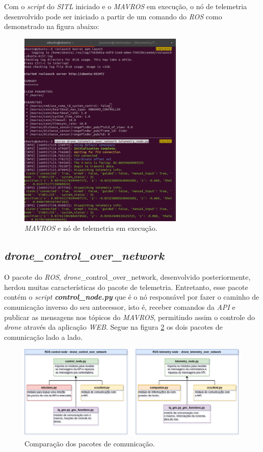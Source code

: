 \documentclass[12pt,a4paper,oneside]{book}
\begin{document}
Com o \textit{script} do \textit{SITL} iniciado e o \textit{MAVROS} em execução, o nó de telemetria desenvolvido pode ser iniciado a partir de um comando do \textit{ROS} como demonstrado na figura abaixo:
%
\begin{figure}[H]
  \centering
  \includegraphics[width=0.7\textwidth]{Images/Desenvolvimento/telemetry_node.png}
  \caption{\textit{MAVROS} e nó de telemetria em execução.}
  \label{fig:telemetry_node.png.0}
\end{figure}
%


\subsection{\textit{drone\_control\_over\_network}}

O pacote do \textit{ROS}, \textit{drone}\_control\_over\_network, desenvolvido posteriormente, herdou muitas características do pacote de telemetria. Entretanto, esse pacote contém o \textit{script} \textbf{\textit{control\_node.py}} que é o nó responsável por fazer o caminho de comunicação inverso do seu antecessor, isto é, receber comandos da \textit{API} e publicar as mensagens nos tópicos do \textit{MAVROS}, permitindo assim o controle do \textit{drone} através da aplicação \textit{WEB}. Segue na figura \ref{fig:comm_nodes.png.0} os dois pacotes de comunicação lado a lado.

%
\begin{figure}[H]
  \centering
  \includegraphics[width=1\textwidth]{Images/Desenvolvimento/comm_nodes.png}
  \caption{Comparação dos pacotes de comunicação.}
  \label{fig:comm_nodes.png.0}
\end{figure}
%
\end{document}
